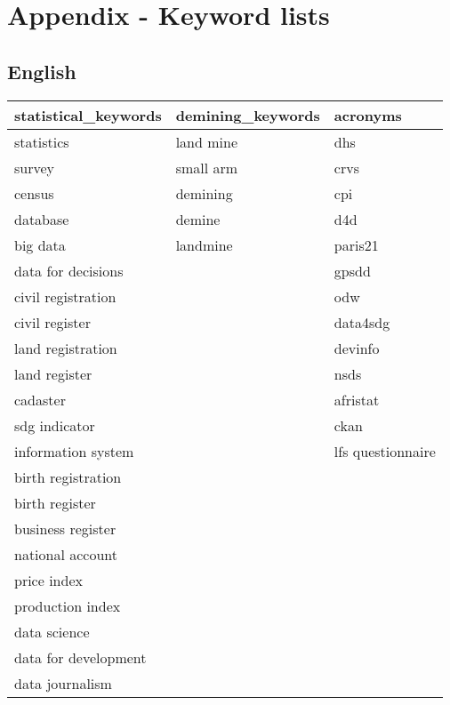 \documentclass[
]{article}
\begin{document}
\hypertarget{appendix-appendix}{%
\appendix}


\hypertarget{Appendix-A}{%
\section{Appendix - Keyword lists}\label{Appendix-A}}

\hypertarget{english}{%
\subsection*{English}\label{english}}

\begin{table}[H]
\centering\begingroup\fontsize{10}{12}\selectfont

\begin{tabular}{l|l|l}
\hline
statistical\_keywords & demining\_keywords & acronyms\\
\hline
statistics & land mine & dhs\\
\hline
survey & small arm & crvs\\
\hline
census & demining & cpi\\
\hline
database & demine & d4d\\
\hline
big data & landmine & paris21\\
\hline
data for decisions &  & gpsdd\\
\hline
civil registration &  & odw\\
\hline
civil register &  & data4sdg\\
\hline
land registration &  & devinfo\\
\hline
land register &  & nsds\\
\hline
cadaster &  & afristat\\
\hline
sdg indicator &  & ckan\\
\hline
information system &  & lfs questionnaire\\
\hline
birth registration &  & \\
\hline
birth register &  & \\
\hline
business register &  & \\
\hline
national account &  & \\
\hline
price index &  & \\
\hline
production index &  & \\
\hline
data science &  & \\
\hline
data for development &  & \\
\hline
data journalism &  & \\

\end{tabular}
\end{table}
\end{document}
